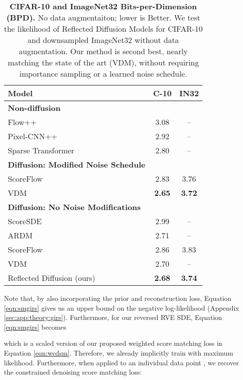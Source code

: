 \documentclass{article}
\theoremstyle{plain}
\theoremstyle{definition}
\theoremstyle{remark}
\begin{document}
\begin{table}[!h]
    \centering
    \begin{tabular}{l c c}
        Model & C-10 & IN32\\
        \hline
        \textbf{Non-diffusion} & &\\
        \hline
        Flow++ \citep{Ho2019FlowIF} & 3.08 & --\\
        Pixel-CNN++ \citep{Salimans2017PixelCNNIT} & 2.92 &--\\
        Sparse Transformer \citep{Child2019GeneratingLS} & 2.80 & --\\
        \hline
        \textbf{Diffusion: Modified Noise Schedule} & &\\
        \hline
        ScoreFlow \citep{Song2021MaximumLT}& 2.83 & 3.76\\
        VDM \citep{Kingma2021VariationalDM} & \textbf{2.65} & \textbf{3.72}\\
        \hline
        \textbf{Diffusion: No Noise Modifications} & &\\
        \hline
        ScoreSDE \citep{Song2020ScoreBasedGM} & 2.99 & --\\
        ARDM \citep{Hoogeboom2021AutoregressiveDM} & 2.71 & --\\
        ScoreFlow \citep{Song2021MaximumLT}& 2.86 & 3.83\\
        VDM \citep{Kingma2021VariationalDM} & 2.70 & --\\
        \hline
        Reflected Diffusion (ours) & \textbf{2.68} & \textbf{3.74}\\
    \end{tabular}
    \caption{\textbf{CIFAR-10 and ImageNet32 Bits-per-Dimension (BPD).} No data augmentaiton; lower is Better. We test the likelihood of Reflected Diffusion Models for CIFAR-10 and downsampled ImageNet32 without data augmentation. Our method is second best, nearly matching the state of the art (VDM), without requiring importance sampling or a learned noise schedule.}
    \label{tab:likelihoods}
    \vspace{-4mm}
\end{table}

Note that, by also incorporating the prior and reconstruction loss, Equation \ref{eqn:smgirs} gives us an upper bound on the negative log-likelihood (Appendix \ref{sec:app:theory:girs}). Furthermore, for our reversed RVE SDE, Equation \ref{eqn:smgirs} becomes

which is a scaled version of our proposed weighted score matching loss in Equation \ref{eqn:wcdsm}. Therefore, we already implicitly train with maximum likelihood. Furthermore, when applied to an individual data point , we recover the constrained denoising score matching loss:
\end{document}
